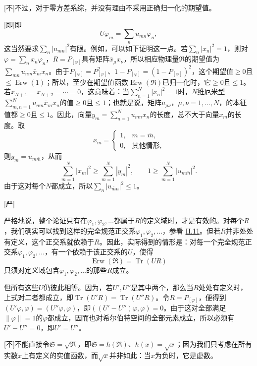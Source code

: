 \documentclass[fontsize=13pt,twoside,openany,headings=normal,parskip=false,bookmarkpackage=false,DIV=calc]{scrbook}
\begin{document}
[不]{不过，对于零方差系综，并没有理由不采用正确归一化的期望值。}

[即]{即
\[
U\varphi_m=\sum_nu_{mn}\varphi_n,
\]\hypertarget{origpage-257}{}\label{origpage-257}这当然要求$\sum_n|u_{mn}|^2$有限。例如，可以如下证明这一点。若$\sum_n|x_n|^2=1$，则对$\varphi=\sum_nx_n\varphi_n$，$R=P_{[\varphi]}$具有矩阵$\bar x_\mu x_\nu$，所以相应物理量$\mathfrak R$的期望值为$\sum_{mn}u_{nm}\bar x_mx_n$。由于$P_{[\varphi]}=P_{[\varphi]}^2$、$1-P_{[\varphi]}=(1-P_{[\varphi]})^2$，这个期望值$\ge0$且$\le\operatorname{Erw}(1)$；所以，至少在期望值函数$\operatorname{Erw}(\mathfrak R)$已归一化时，它$\ge0$且$\le1$。若$x_{N+1}=x_{N+2}=\cdots=0$，这意味着：当$\sum_{n=1}^N|x_n|^2=1$时，$N$维厄米型$\sum_{m,\allowbreak n=1}^Nu_{nm}\bar x_mx_n$的值$\ge0$且$\le1$；也就是说，矩阵$u_{\mu\nu}$，$\mu,\allowbreak \nu=1,\allowbreak \ldots,\allowbreak N$，的本征值都$\ge0$且$\le1$。因此，向量$y_m=\sum_{n=1}^Nu_{mn}x_n$的长度，总不大于向量$x_m$的长度。取
\[
x_m=\begin{cases}1,&m=\bar m,\\0,&\text{其他情形},\end{cases}
\]
则$y_m=u_{m\bar m}$，从而
\[
\sum_{m=1}^N|x_m|^2\ge\sum_{m=1}^N|y_m|^2,\qquad
1\ge\sum_{m=1}^N|u_{m\bar m}|^2.
\]
由于这对每个$N$都成立，所以$\sum_n|u_{\bar mn}|^2\le1$。}

[严]{严格地说，整个论证只有在$\varphi_1,\allowbreak \varphi_2,\allowbreak \ldots$都属于$R$的定义域时，才是有效的。对每个$R$，我们确实可以找到这样的完全规范正交系$\varphi_1,\allowbreak \varphi_2,\allowbreak \ldots$，参看 \hyperref[sec:II.11]{II.11}。但若$R$并非处处有定义，这个正交系就依赖于$R$。因此，实际得到的情形是：对每一个完全规范正交系$\varphi_1,\allowbreak \varphi_2,\allowbreak \ldots$，有一个依赖于该正交系的$U$，使得
\[
\operatorname{Erw}(\mathfrak R)=\operatorname{Tr}(UR)
\]
只须对定义域包含$\varphi_1,\allowbreak \varphi_2,\allowbreak \ldots$的那些$R$成立。

但所有这些$U$仍彼此相等。因为，若$U',\allowbreak U''$是其中两个，那么当$R$处处有定义时，上式对二者都成立，即$\operatorname{Tr}(U'R)=\operatorname{Tr}(U''R)$。令$R=P_{[\varphi]}$，便得到$(U'\varphi,\allowbreak \varphi)=(U''\varphi,\allowbreak \varphi)$，即$((U'-U'')\varphi,\allowbreak \varphi)=0$。由于这对全部满足$\|\varphi\|=1$的$\varphi$都成立，因而也对希尔伯特空间的全部元素成立，所以必须有$U'-U''=0$，即$U'=U''$。}

[不]{不能直接令$\mathfrak S=\sqrt{\mathfrak R}$，即$\mathfrak S=h(\mathfrak R)$、$h(x)=\sqrt x$；因为我们只考虑在所有实数$x$上有定义的实值函数，而$\sqrt x$并非如此：当$x$为负时，它是虚数。}
\end{document}
